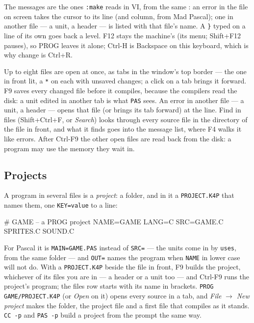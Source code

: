 The messages are the ones \verb|:make| reads in VI, from the same
: an error in the file on screen takes the
cursor to its line (and column, from Mad Pascal); one in another file ---
a unit, a header --- is listed with that file's name. A \verb|}| typed on
a line of its own goes back a level. F12 stays the machine's (its menu;
Shift+F12 pauses), so PROG leaves it alone; Ctrl-H is Backspace on this
keyboard, which is why change is Ctrl+R.

Up to eight files are open at once, as tabs in the window's top border ---
the one in front lit, a \verb|*| on each with unsaved changes; a click on
a tab brings it forward. F9 saves every
changed file before it compiles, because the compilers read the disk: a
unit edited in another tab is what \verb|PAS| sees. An error in another
file --- a unit, a header --- opens that file (or brings its tab forward)
at the line. Find in files (Shift+Ctrl+F, or \emph{Search}) looks through
every source file in the directory of the file in front, and what it finds
goes into the message list, where F4 walks it like errors. After Ctrl-F9
the other open files are read back from the disk: a program may use the
memory they wait in.

\subsection*{Projects}
A program in several files is a \emph{project}: a folder, and in it a
\texttt{PROJECT.K4P} that names them, one \texttt{KEY=value} to a line:

\begin{type}
# GAME -- a PROG project
NAME=GAME
LANG=C
SRC=GAME.C SPRITES.C SOUND.C
\end{type}

\noindent For Pascal it is \texttt{MAIN=GAME.PAS} instead of
\texttt{SRC=} --- the units come in by \verb|uses|, from the same folder
--- and \texttt{OUT=} names the program when \texttt{NAME} in lower case
will not do. With a \texttt{PROJECT.K4P} beside the file in front, F9
builds the project, whichever of its files you are in --- a header or a
unit too --- and Ctrl-F9 runs the project's program; the files row starts
with its name in brackets. \verb|PROG GAME/PROJECT.K4P| (or
\emph{Open} on it) opens every source in a tab, and \emph{File}
$\rightarrow$ \emph{New project} makes the folder, the project file and a
first file that compiles as it stands. \verb|CC -p| and \verb|PAS -p|
build a project from the prompt the same way.

